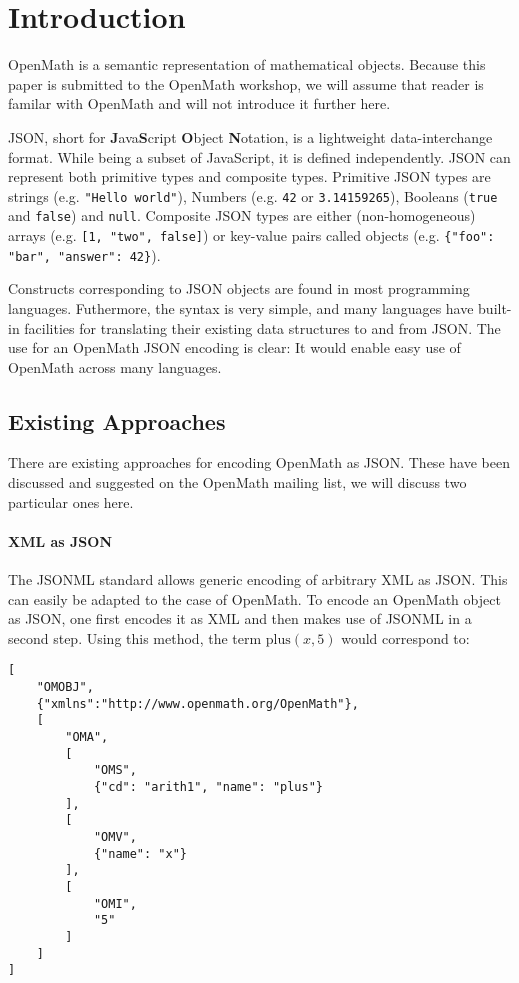 \section{Introduction}

OpenMath is a semantic representation of mathematical objects. 
Because this paper is submitted to the OpenMath workshop, we will assume that reader is familar with OpenMath and will not introduce it further here. 

JSON, short for \textbf{J}ava\textbf{S}cript \textbf{O}bject \textbf{N}otation, is a lightweight data-interchange format. 
While being a subset of JavaScript, it is defined independently. 
JSON can represent both primitive types and composite types.
Primitive JSON types are strings (e.g. \lstinline{"Hello world"}), Numbers (e.g. \lstinline{42} or \lstinline{3.14159265}), Booleans (\lstinline{true} and \lstinline{false}) and \lstinline{null}. 
Composite JSON types are either (non-homogeneous) arrays (e.g. \lstinline{[1, "two", false]}) or key-value pairs called objects (e.g. \lstinline|{"foo": "bar", "answer": 42}|). 

Constructs corresponding to JSON objects are found in most programming languages. 
Futhermore, the syntax is very simple, and many languages have built-in facilities for translating their existing data structures to and from JSON. 
The use for an OpenMath JSON encoding is clear: It would enable easy use of OpenMath across many languages. 

\subsection{Existing Approaches}
There are existing approaches for encoding OpenMath as JSON. 
These have been discussed and suggested on the OpenMath mailing list, we will discuss two particular ones here. 

\paragraph{XML as JSON}
The JSONML standard  allows generic encoding of arbitrary XML as JSON. 
This can easily be adapted to the case of OpenMath. 
To encode an OpenMath object as JSON, one first encodes it as XML and then makes use of JSONML in a second step. 
Using this method, the term $\mathrm{plus}(x, 5)$ would correspond to: 
\begin{lstlisting}
[
    "OMOBJ",
    {"xmlns":"http://www.openmath.org/OpenMath"},
    [
        "OMA",
        [
            "OMS", 
            {"cd": "arith1", "name": "plus"}
        ],
        [
            "OMV", 
            {"name": "x"}
        ],
        [
            "OMI", 
            "5"
        ]
    ]
]
\end{lstlisting}

